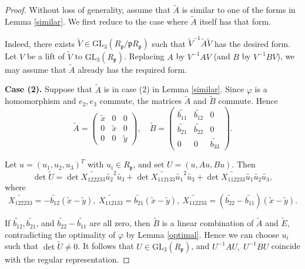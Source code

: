 \documentclass[12pt]{article}
\theoremstyle{plain}
\theoremstyle{definition}
\theoremstyle{remark}
\begin{document}
\begin{proof}
Without loss of generality, assume that $\widetilde{A}$ is similar to one of the forms in Lemma \ref{similar}. We first reduce to the case where $\widetilde{A}$ itself has that form. 

Indeed, there exists $\widetilde{V} \in \mathrm{GL}_3(R_\mathfrak{p}/\mathfrak{p}R_\mathfrak{p})$ such that $\widetilde{V}^{-1}\widetilde{A}\widetilde{V}$ has the desired form. Let $V$ be a lift of $\widetilde{V}$ to $\mathrm{GL}_3(R_\mathfrak{p})$. Replacing $A$ by $V^{-1}AV$ (and $B$ by $V^{-1}BV$), we may assume that $\widetilde{A}$ already has the required form.

\medskip

\noindent
\textbf{Case (2).} Suppose that $\widetilde{A}$ is in case (2) in Lemma \ref{similar}. Since $\varphi$ is a homomorphism and $e_2,e_3$ commute, the matrices $\widetilde{A}$ and $\widetilde{B}$ commute. Hence
$$
\widetilde{A}=\begin{pmatrix}
\widetilde{x} & 0 & 0 \\
0 & \widetilde{x} & 0 \\
0 & 0 & \widetilde{y}
\end{pmatrix},
\quad
\widetilde{B}=\begin{pmatrix}
\widetilde{b_{11}} & \widetilde{b_{12}} & 0 \\
\widetilde{b_{21}} & \widetilde{b_{22}} & 0 \\
0 & 0 & \widetilde{b_{33}}
\end{pmatrix}.
$$

Let $u=(u_1,u_2,u_3)^T$ with $u_i \in R_\mathfrak{p}$, and set $U=(u,Au,Bu)$. Then
$$
\det \widetilde{U}
=\det \widetilde{X_{122233}}\widetilde{u_2}^2\widetilde{u_3}
+\det \widetilde{X_{112133}}\widetilde{u_1}^2\widetilde{u_3}
+\det \widetilde{X_{112233}}\widetilde{u_1}\widetilde{u_2}\widetilde{u_3},
$$
where
$$
\widetilde{X_{122233}}=-\widetilde{b_{12}}(\widetilde{x}-\widetilde{y}),\ 
\widetilde{X_{112133}}=\widetilde{b_{21}}(\widetilde{x}-\widetilde{y}),\ 
\widetilde{X_{112233}}=(\widetilde{b_{22}}-\widetilde{b_{11}})(\widetilde{x}-\widetilde{y}).
$$

If $\widetilde{b_{12}},\widetilde{b_{21}}$, and $\widetilde{b_{22}}-\widetilde{b_{11}}$ are all zero, then $\widetilde{B}$ is a linear combination of $\widetilde{A}$ and $\widetilde{E}$, contradicting the optimality of $\varphi$ by Lemma \ref{optimal}. Hence we can choose $u_i$ such that $\det \widetilde{U}\ne 0$. It follows that $U \in \mathrm{GL}_3(R_\mathfrak{p})$, and $U^{-1}AU,\; U^{-1}BU$ coincide with the regular representation.


\end{proof}
\end{document}
